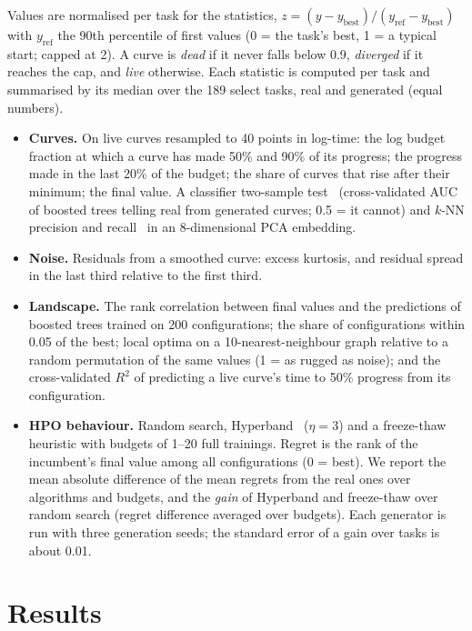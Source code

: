 \documentclass[10pt]{article}
\begin{document}
Values are normalised per task for the statistics, $z = (y - y_\text{best}) / (y_\text{ref} - y_\text{best})$ with
$y_\text{ref}$ the 90th percentile of first values (0 = the task's best, 1 = a typical start; capped at 2). A curve
is \emph{dead} if it never falls below 0.9, \emph{diverged} if it reaches the cap, and \emph{live} otherwise. Each
statistic is computed per task and summarised by its median over the 189 select tasks, real and generated (equal
numbers).
\begin{itemize}
  \item \textbf{Curves.} On live curves resampled to 40 points in log-time: the log budget fraction at which a curve
    has made 50\% and 90\% of its progress; the progress made in the last 20\% of the budget; the share of curves
    that rise after their minimum; the final value. A classifier two-sample test~\cite{lopezpaz2017revisiting}
    (cross-validated AUC of boosted trees telling real from generated curves; 0.5 = it cannot) and $k$-NN precision
    and recall~\cite{kynkaanniemi2019improved} in an 8-dimensional PCA embedding.
  \item \textbf{Noise.} Residuals from a smoothed curve: excess kurtosis, and residual spread in the last third
    relative to the first third.
  \item \textbf{Landscape.} The rank correlation between final values and the predictions of boosted trees trained
    on 200 configurations; the share of configurations within 0.05 of the best; local optima on a
    10-nearest-neighbour graph relative to a random permutation of the same values (1 = as rugged as noise); and the
    cross-validated $R^2$ of predicting a live curve's time to 50\% progress from its configuration.
  \item \textbf{HPO behaviour.} Random search, Hyperband~\cite{li2018hyperband} ($\eta = 3$) and a freeze-thaw
    heuristic with budgets of 1--20 full trainings. Regret is the rank of the incumbent's final value among all
    configurations (0 = best). We report the mean absolute difference of the mean regrets from the real ones over
    algorithms and budgets, and the \emph{gain} of Hyperband and freeze-thaw over random search (regret difference
    averaged over budgets). Each generator is run with three generation seeds; the standard error of a gain over
    tasks is about 0.01.
\end{itemize}

\section{Results}
\label{sec:results}
\end{document}

